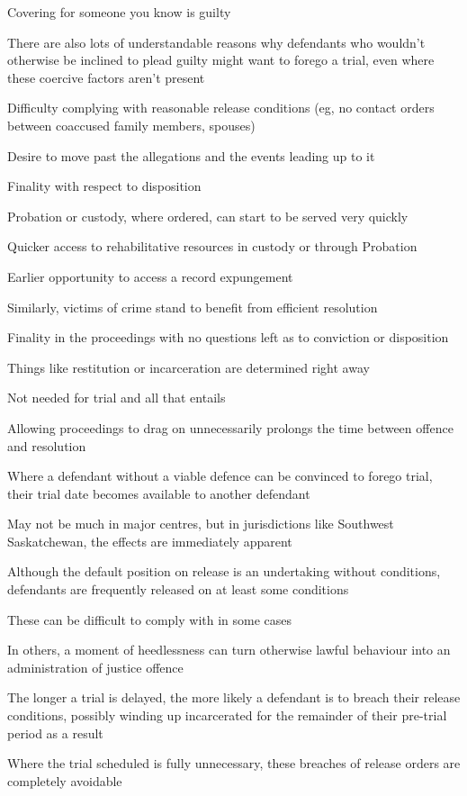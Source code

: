 Covering for someone you know is guilty

There are also lots of understandable reasons why defendants who wouldn't otherwise be inclined to plead guilty might want to forego a trial, even where these coercive factors aren't present

Difficulty complying with reasonable release conditions (eg, no contact orders between coaccused family members, spouses)

Desire to move past the allegations and the events leading up to it

Finality with respect to disposition

Probation or custody, where ordered, can start to be served very quickly

Quicker access to rehabilitative resources in custody or through Probation

Earlier opportunity to access a record expungement

Similarly, victims of crime stand to benefit from efficient resolution

Finality in the proceedings with no questions left as to conviction or disposition

Things like restitution or incarceration are determined right away

Not needed for trial and all that entails

Allowing proceedings to drag on unnecessarily prolongs the time between offence and resolution

Where a defendant without a viable defence can be convinced to forego trial, their trial date becomes available to another defendant

May not be much in major centres, but in jurisdictions like Southwest Saskatchewan, the effects are immediately apparent

Although the default position on release is an undertaking without conditions, defendants are frequently released on at least some conditions

These can be difficult to comply with in some cases

In others, a moment of heedlessness can turn otherwise lawful behaviour into an administration of justice offence

The longer a trial is delayed, the more likely a defendant is to breach their release conditions, possibly winding up incarcerated for the remainder of their pre-trial period as a result

Where the trial scheduled is fully unnecessary, these breaches of release orders are completely avoidable

